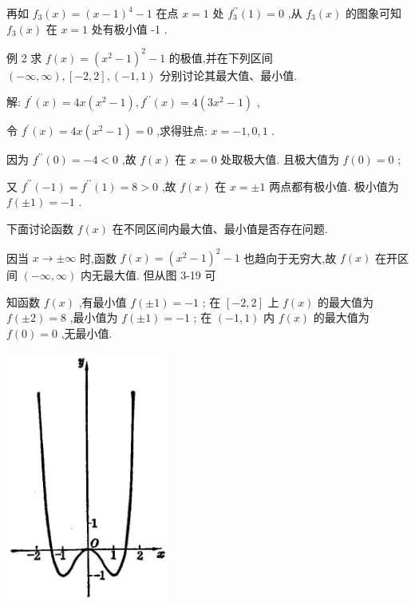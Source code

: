 \documentclass[10pt]{article}
\begin{document}
再如 \({f}_{3}\left( x\right) = {\left( x - 1\right) }^{4} - 1\) 在点 \(x = 1\) 处 \({f}_{3}^{\prime \prime }\left( 1\right) = 0\) ,从 \({f}_{3}\left( x\right)\) 的图象可知 \({f}_{3}\left( x\right)\) 在 \(x = 1\) 处有极小值 -1 .

例 2 求 \(f\left( x\right) = {\left( {x}^{2} - 1\right) }^{2} - 1\) 的极值,并在下列区间 \(\left( {-\infty ,\infty }\right) ,\left\lbrack {-2,2}\right\rbrack ,\left( {-1,1}\right)\) 分别讨论其最大值、最小值.

解: \({f}^{\prime }\left( x\right) = {4x}\left( {{x}^{2} - 1}\right) ,{f}^{\prime \prime }\left( x\right) = 4\left( {3{x}^{2} - 1}\right)\) ,

令 \({f}^{\prime }\left( x\right) = {4x}\left( {{x}^{2} - 1}\right) = 0\) ,求得驻点: \(x = - 1,0,1\) .

因为 \({f}^{\prime \prime }\left( 0\right) = - 4 < 0\) ,故 \(f\left( x\right)\) 在 \(x = 0\) 处取极大值. 且极大值为 \(f\left( 0\right) = 0\) ;

又 \({f}^{\prime \prime }\left( {-1}\right) = {f}^{\prime \prime }\left( 1\right) = 8 > 0\) ,故 \(f\left( x\right)\) 在 \(x = \pm 1\) 两点都有极小值. 极小值为 \(f\left( {\pm 1}\right) = - 1\) .

下面讨论函数 \(f\left( x\right)\) 在不同区间内最大值、最小值是否存在问题.

因当 \(x \rightarrow \pm \infty\) 时,函数 \(f\left( x\right) = {\left( {x}^{2} - 1\right) }^{2} - 1\) 也趋向于无穷大,故 \(f\left( x\right)\) 在开区间 \(\left( {-\infty ,\infty }\right)\) 内无最大值. 但从图 3-19 可

知函数 \(f\left( x\right)\) ,有最小值 \(f\left( {\pm 1}\right) = - 1\) ; 在 \(\left\lbrack {-2,2}\right\rbrack\) 上 \(f\left( x\right)\) 的最大值为 \(f\left( {\pm 2}\right) = 8\) ,最小值为 \(f\left( {\pm 1}\right) = - 1\) ; 在 \(\left( {-1,1}\right)\) 内 \(f\left( x\right)\) 的最大值为 \(f\left( 0\right) = 0\) ,无最小值.

\begin{center}
\includegraphics[max width=0.4\textwidth]{images/01912c18-5c3f-733d-b775-749ba9897a9d_164_907490.jpg}
\end{center}
\end{document}
